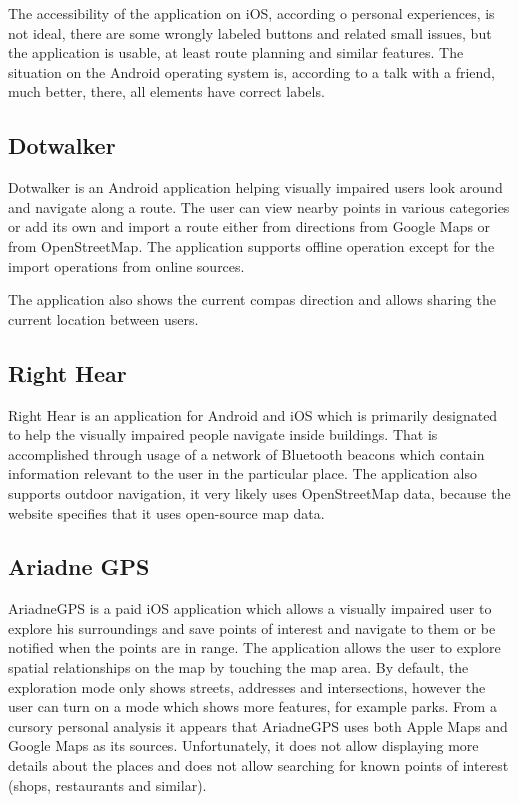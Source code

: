 \documentclass[nolof,digital]{fithesis3}
\begin{document}
The accessibility of the application on iOS, according o personal experiences, is not ideal, there are some wrongly labeled buttons and related small issues, but the application is usable, at least route planning and similar features. The situation on the Android operating system is, according to a talk with a friend, much better, there, all elements have correct labels.
\subsection{Dotwalker}
Dotwalker \parencite{dotwalker} is an Android application helping visually impaired users look around and navigate along a route. The user can view nearby points in various categories or add its own and import a route either from directions from Google Maps or from OpenStreetMap. The application supports offline operation except for the import operations from online sources.

The application also shows the current compas direction and allows sharing the current location between users.
\subsection{Right Hear}
Right Hear \parencite{righthear} is an application for Android and iOS which is primarily designated to help the visually impaired people navigate inside buildings. That is accomplished through usage of a network of Bluetooth beacons which contain information relevant to the user in the particular place. The application also supports outdoor navigation, it very likely uses OpenStreetMap data, because the website specifies that it uses open-source map data.
\subsection{Ariadne GPS}
AriadneGPS \parencite{ariadnegps} is a paid iOS application which allows a visually impaired user to explore his surroundings and save points of interest and navigate to them or be notified when the points are in range. The application allows the user to explore spatial relationships on the map by touching the map area. By default, the exploration mode only shows streets, addresses and intersections, however the user can turn on a mode which shows more features, for example parks. From a cursory personal analysis it appears that AriadneGPS uses both Apple Maps and Google Maps as its sources. Unfortunately, it does not allow displaying more details about the places and does not allow searching for known points of interest (shops, restaurants and similar).
\end{document}
